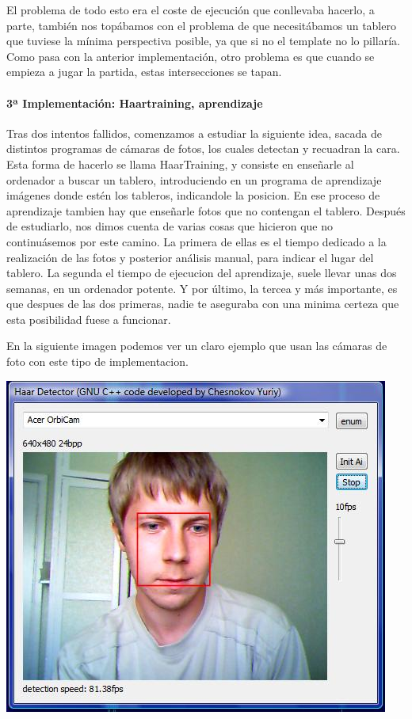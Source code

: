 \documentclass[12pt,a4paper]{report}
\begin{document}
El problema de todo esto era el coste de ejecución que conllevaba hacerlo, a
parte, también nos topábamos con el problema de que necesitábamos un tablero que
tuviese la mínima perspectiva posible, ya que si no el template no lo pillaría. 
Como pasa con la anterior implementación, otro problema es que cuando se empieza
a jugar la partida, estas intersecciones se tapan. 


\paragraph{3ª Implementación: Haartraining, aprendizaje}

Tras dos intentos fallidos, comenzamos a estudiar la siguiente idea, sacada de
distintos programas de cámaras de fotos, los cuales detectan y recuadran la
cara. Esta forma de hacerlo se llama HaarTraining, y consiste en enseñarle al
ordenador a buscar un tablero, introduciendo en un programa de aprendizaje
imágenes donde estén los tableros, indicandole la posicion. En ese proceso de
aprendizaje tambien hay que enseñarle fotos que no contengan el tablero.
Después de estudiarlo, nos dimos cuenta de varias cosas que hicieron que no
continuásemos por este camino. La primera de ellas es el tiempo dedicado a la
realización de las fotos y posterior análisis manual, para indicar el lugar del
tablero. La segunda el tiempo de ejecucion del aprendizaje, suele llevar unas
dos semanas, en un ordenador potente. Y por último, la tercea y más importante,
es que despues de las dos primeras, nadie te aseguraba con una minima certeza 
que esta posibilidad fuese a funcionar.

En la siguiente imagen podemos ver un claro ejemplo que usan las cámaras de foto
con este tipo de implementacion.

\includegraphics[scale=1]{haartraining.jpg} 
\end{document}
